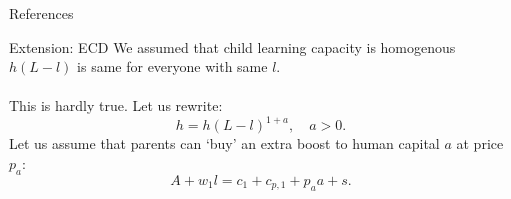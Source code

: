 \begin{frame}[allowframebreaks]{References}
\scriptsize
\setlength{\baselineskip}{8pt}


\end{frame}


\begin{frame}{Extension: ECD}
We assumed that child learning capacity is homogenous $h(L-l)$ is same for everyone with same $l$. \\~\\

This is hardly true. Let us rewrite:
\[
h=h(L-l)^{1+a}, \quad a>0.
\]
Let us assume that parents can `buy' an extra boost to human capital $a$ at price $p_{a}$:
\[
A+w_{1}l=c_{1}+c_{p,1}+p_{a}a+s.
\]
\end{frame}

